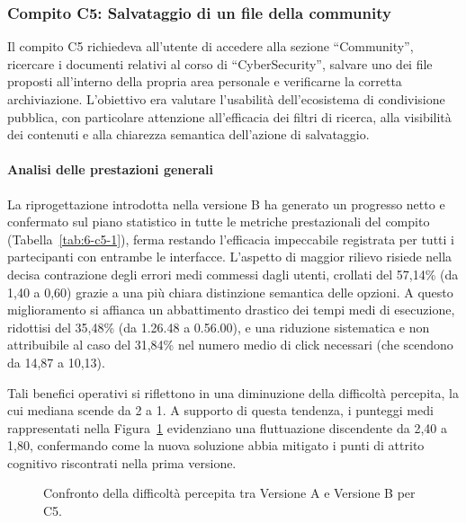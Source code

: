 \subsubsection{Compito C5: Salvataggio di un file della community}

Il compito C5 richiedeva all’utente di accedere alla sezione ``Community'', ricercare i documenti relativi al corso di ``CyberSecurity'', salvare uno dei file proposti all’interno della propria area personale e verificarne la corretta archiviazione. L’obiettivo era valutare l’usabilità dell’ecosistema di condivisione pubblica, con particolare attenzione all’efficacia dei filtri di ricerca, alla visibilità dei contenuti e alla chiarezza semantica dell'azione di salvataggio.

\paragraph{Analisi delle prestazioni generali}

La riprogettazione introdotta nella versione B ha generato un progresso netto e confermato sul piano statistico in tutte le metriche prestazionali del compito (Tabella~\ref{tab:6-c5-1}), ferma restando l'efficacia impeccabile registrata per tutti i partecipanti con entrambe le interfacce. L'aspetto di maggior rilievo risiede nella decisa contrazione degli errori medi commessi dagli utenti, crollati del 57,14\% (da 1,40 a 0,60) grazie a una più chiara distinzione semantica delle opzioni. A questo miglioramento si affianca un abbattimento drastico dei tempi medi di esecuzione, ridottisi del 35,48\% (da 1.26.48 a 0.56.00), e una riduzione sistematica e non attribuibile al caso del 31,84\% nel numero medio di click necessari (che scendono da 14,87 a 10,13).

Tali benefici operativi si riflettono in una diminuzione della difficoltà percepita, la cui mediana scende da 2 a 1. A supporto di questa tendenza, i punteggi medi rappresentati nella Figura~\ref{fig:6-c5-1} evidenziano una fluttuazione discendente da 2,40 a 1,80, confermando come la nuova soluzione abbia mitigato i punti di attrito cognitivo riscontrati nella prima versione.

\begin{figure}[H]
	\centering
	\caption{Confronto della difficoltà percepita tra Versione A e Versione B per C5.}
	\label{fig:6-c5-1}
\end{figure}

